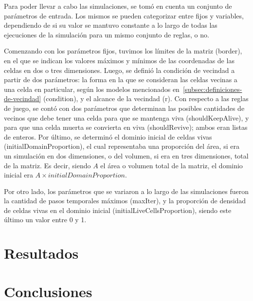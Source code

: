 \documentclass[11pt]{article}
\begin{document}
    Para poder llevar a cabo las simulaciones, se tomó en cuenta un conjunto de parámetros de entrada.
    Los mismos se pueden categorizar entre fijos y variables, dependiendo de si su valor se mantuvo
    constante a lo largo de todas las ejecuciones de la simulación para un mismo conjunto de reglas, o no.

    Comenzando con los parámetros fijos, tuvimos los límites de la matriz (border),
    en el que se indican los valores máximos y mínimos de las coordenadas de las celdas en dos o tres dimensiones.
    Luego, se definió la condición de vecindad a partir de dos parámetros:
    la forma en la que se consideran las celdas vecinas a una celda en particular, según los modelos mencionados
    en~\ref{subsec:definiciones-de-vecindad} (condition), y el alcance de la vecindad (r).
    Con respecto a las reglas de juego, se contó con dos parámetros que determinan las posibles cantidades de
    vecinos que debe tener una celda para que se mantenga viva (shouldKeepAlive),
    y para que una celda muerta se convierta en viva (shouldRevive); ambos eran listas de enteros.
    Por último, se determinó el dominio inicial de celdas vivas (initialDomainProportion), el
    cual representaba una proporción del área, si era un simulación en dos dimensiones, o del volumen,
    si era en tres dimensiones, total de la matriz.
    Es decir, siendo $A$ el área o volumen total de la matriz, el dominio inicial era $A \times initialDomainProportion$.

    Por otro lado, los parámetros que se variaron a lo largo de las simulaciones fueron la cantidad de pasos temporales
    máximos (maxIter), y la proporción de densidad de celdas vivas en el dominio inicial (initialLiveCellsProportion),
    siendo este último un valor entre 0 y 1.


    \section{Resultados}\label{sec:resultados}


    \section{Conclusiones}\label{sec:conclusiones}
\end{document}
